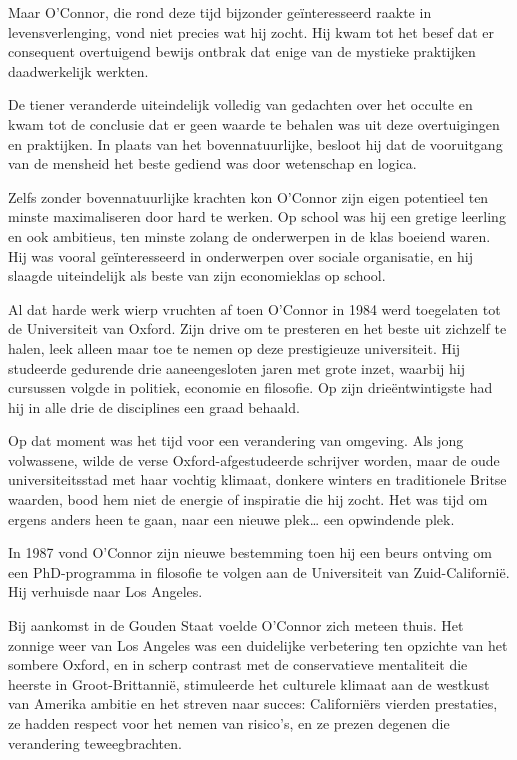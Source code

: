 \documentclass[
  a5paper,
  smalldemyvopaper,11pt,twoside,onecolumn,openright,extrafontsizes]{memoir}
\begin{document}
Maar O'Connor, die rond deze tijd bijzonder geïnteresseerd raakte in
levensverlenging, vond niet precies wat hij zocht. Hij kwam tot het
besef dat er consequent overtuigend bewijs ontbrak dat enige van de
mystieke praktijken daadwerkelijk werkten.

De tiener veranderde uiteindelijk volledig van gedachten over het
occulte en kwam tot de conclusie dat er geen waarde te behalen was uit
deze overtuigingen en praktijken. In plaats van het bovennatuurlijke,
besloot hij dat de vooruitgang van de mensheid het beste gediend was
door wetenschap en logica.

Zelfs zonder bovennatuurlijke krachten kon O'Connor zijn eigen
potentieel ten minste maximaliseren door hard te werken. Op school was
hij een gretige leerling en ook ambitieus, ten minste zolang de
onderwerpen in de klas boeiend waren. Hij was vooral geïnteresseerd in
onderwerpen over sociale organisatie, en hij slaagde uiteindelijk als
beste van zijn economieklas op school.

Al dat harde werk wierp vruchten af toen O'Connor in 1984 werd
toegelaten tot de Universiteit van Oxford. Zijn drive om te presteren en
het beste uit zichzelf te halen, leek alleen maar toe te nemen op deze
prestigieuze universiteit. Hij studeerde gedurende drie aaneengesloten
jaren met grote inzet, waarbij hij cursussen volgde in politiek,
economie en filosofie. Op zijn drieëntwintigste had hij in alle drie de
disciplines een graad behaald.

Op dat moment was het tijd voor een verandering van omgeving. Als jong
volwassene, wilde de verse Oxford-afgestudeerde schrijver worden, maar
de oude universiteitsstad met haar vochtig klimaat, donkere winters en
traditionele Britse waarden, bood hem niet de energie of inspiratie die
hij zocht. Het was tijd om ergens anders heen te gaan, naar een nieuwe
plek\ldots{} een opwindende plek.

In 1987 vond O'Connor zijn nieuwe bestemming toen hij een beurs ontving
om een PhD-programma in filosofie te volgen aan de Universiteit van
Zuid-Californië. Hij verhuisde naar Los Angeles.

Bij aankomst in de Gouden Staat voelde O'Connor zich meteen thuis. Het
zonnige weer van Los Angeles was een duidelijke verbetering ten opzichte
van het sombere Oxford, en in scherp contrast met de conservatieve
mentaliteit die heerste in Groot-Brittannië, stimuleerde het culturele
klimaat aan de westkust van Amerika ambitie en het streven naar succes:
Californiërs vierden prestaties, ze hadden respect voor het nemen van
risico's, en ze prezen degenen die verandering teweegbrachten.
\end{document}
